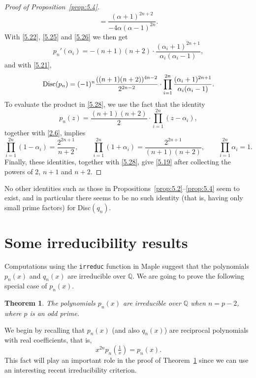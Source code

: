 \documentclass{amsart}
\theoremstyle{plain}
\newtheorem{theorem}{Theorem}[section]
\numberwithin{equation}{section}
\begin{document}
\begin{proof}[Proof of Proposition~\ref{prop:5.4}]
\begin{equation}
=\frac{(\alpha+1)^{2n+2}}{-4\alpha(\alpha-1)^{2n}}.
\end{equation}
With \eqref{5.22}, \eqref{5.25} and \eqref{5.26} we then get
\[
p_n'(\alpha_i) 
=-(n+1)(n+2)\cdot\frac{(\alpha_i+1)^{2n+1}}{\alpha_i(\alpha_i-1)},
\]
and with \eqref{5.21},
\begin{equation}\label{5.28}
{\rm Disc}(p_n)=(-1)^n \frac{((n+1)(n+2))^{4n-2}}{2^{2n-2}}
\cdot\prod_{i=1}^{2n}\frac{(\alpha_i+1)^{2n+1}}{\alpha_i(\alpha_i-1)}.
\end{equation}
To evaluate the product in \eqref{5.28}, we use the fact that the identity
\[
p_n(z)=\frac{(n+1)(n+2)}{2}\cdot\prod_{i=1}^{2n}(z-\alpha_i),
\]
together with \eqref{2.6}, implies
\[
\prod_{i=1}^{2n}(1-\alpha_i)=\frac{2^{2n+1}}{n+2},\qquad
\prod_{i=1}^{2n}(1+\alpha_i)=\frac{2^{2n+1}}{(n+1)(n+2)},\qquad
\prod_{i=1}^{2n}\alpha_i=1.
\]
Finally, these identities, together with \eqref{5.28}, give \eqref{5.19} after
collecting the powers of 2, $n+1$ and $n+2$.
\end{proof}

No other identities such as those in Propositions~\ref{prop:5.2}--\ref{prop:5.4}
seem to exist, and in particular there seems to be no such
identity (that is, having only small prime factors) for Disc$(q_n)$.

\section{Some irreducibility results}\label{sec:6}

Computations using the {\tt irreduc} function in Maple suggest that the 
polynomials $p_n(x)$ and $q_n(x)$ are irreducible over $\mathbb Q$. We are 
going to prove the following special case of $p_n(x)$.

\begin{theorem}\label{thm:6.1}
The polynomials $p_n(x)$ are irreducible over $\mathbb Q$ when $n=p-2$, 
where $p$ is an odd prime.
\end{theorem}

We begin by recalling that $p_n(x)$ (and also $q_n(x)$) are 
reciprocal polynomials with real coefficients, that is,
\[
x^{2n}p_n(\tfrac{1}{x})=p_n(x).
\]
This fact will play an important role in the proof of Theorem~\ref{thm:6.1}
since we can use an interesting recent irreducibility criterion.
\end{document}
